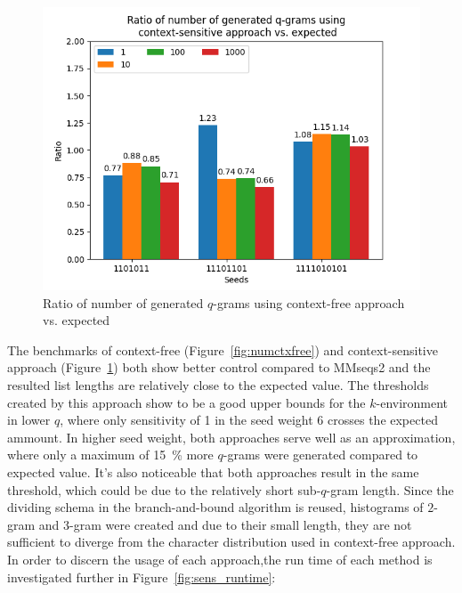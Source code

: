\documentclass[twoside,a4paper,bsc]{master}
\newcommand{\Qgram}[1]{\(#1\)-gram}
\begin{document}
\begin{figure}
\centering
\includegraphics[scale=0.6]{graphics/threshold_contextsens.png}
\caption{Ratio of number of generated \Qgram{q}s using context-free
approach vs. expected}
\label{fig:numctxsens}
\end{figure}
The benchmarks of context-free (Figure~\ref{fig:numctxfree}) and
context-sensitive approach (Figure~\ref{fig:numctxsens}) both show better
control compared to MMseqs2 and the resulted list lengths are relatively
close to the expected value. The thresholds created by this approach show
to be a good upper bounds for the \(k\)-environment in lower \(q\), where
only sensitivity of 1 in the seed weight 6 crosses the expected ammount. In
higher seed weight, both approaches serve well as an approximation, where
only a maximum of 15~\% more \Qgram{q}s were generated compared to
expected value.
It's also noticeable that both approaches result in the same
threshold, which could be due to the relatively short sub-\Qgram{q} length.
Since the dividing schema in the branch-and-bound algorithm is reused,
histograms
of \Qgram{2} and \Qgram{3} were created and due to their small length, they
are
not sufficient to diverge from the character distribution used in
context-free
approach. In order to discern the usage of each approach,the run time
of each method is investigated further in Figure~\ref{fig:sens_runtime}:
\end{document}
